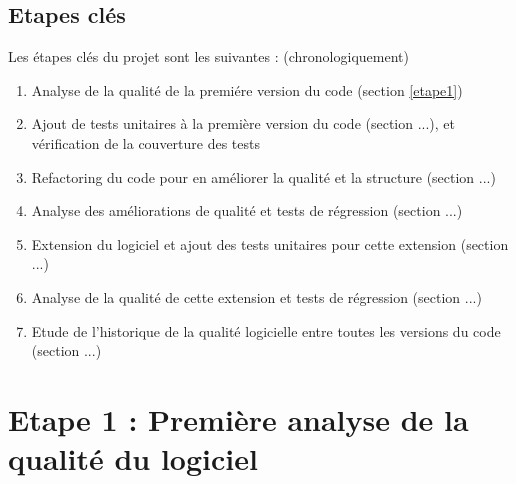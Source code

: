 \documentclass[12pt,a4paper,final]{article}
\begin{document}
\subsection{Etapes clés}
Les étapes clés du projet sont les suivantes : (chronologiquement)
\begin{enumerate}
\item Analyse de la qualité de la premiére version du code (section \ref{etape1})
\item Ajout de tests unitaires à la première version du code (section ...), et vérification de la couverture des tests
\item Refactoring du code pour en améliorer la qualité et la structure (section ...)
\item Analyse des améliorations de qualité et tests de régression (section ...)
\item Extension du logiciel et ajout des tests unitaires pour cette extension (section ...)
\item Analyse de la qualité de cette extension et tests de régression (section ...)
\item Etude de l'historique de la qualité logicielle entre toutes les versions du code (section ...)
\end{enumerate}
\section{Etape 1 : Première analyse de la qualité du logiciel }\label{sec:etape1}
\end{document}
